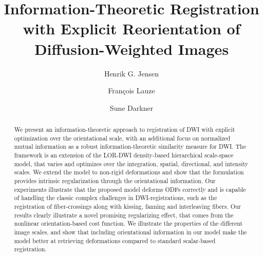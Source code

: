 \documentclass[twocolumn]{svjour3}
\author{Henrik G. Jensen \and Fran\c{c}ois Lauze \and Sune Darkner}
\institute{H. G. Jensen \at Dept. of Computer Science, University of Copenhagen \\
  \email{henrikgjensen@gmail.com}
  \and F. Lauze \at
  Dept. of Computer Science, University of Copenhagen \\
  \email{francois@di.ku.dk}           %
  \and
  S. Darkner\at
  Dept. of Computer Science, University of Copenhagen \\
  \email{darkner@diku.dk}           %
  }
\begin{document}
\title{Information-Theoretic Registration with Explicit Reorientation of Diffusion-Weighted Images}


\maketitle



\begin{abstract}
  We present an information-theoretic approach to registration of DWI with explicit
  optimization over the orientational scale, with an additional focus on normalized mutual
  information as a robust information-theoretic similarity measure for DWI. The framework
  is an extension of the LOR-DWI density-based hierarchical scale-space model, that varies
  and optimizes over the integration, spatial, directional, and intensity scales. We
  extend the model to non-rigid deformations and show that the formulation provides
  intrinsic regularization through the orientational information. Our experiments
  illustrate that the proposed model deforms ODFs correctly and is capable of handling the
  classic complex challenges in DWI-registrations, such as the registration of
  fiber-crossings along with kissing, fanning and interleaving fibers. Our results clearly
  illustrate a novel promising regularizing effect, that comes from the nonlinear
  orientation-based cost function. We illustrate the properties of the different image
  scales, and show that including orientational information in our model make the model
  better at retrieving deformations compared to standard scalar-based registration.
\end{abstract}





\end{document}
